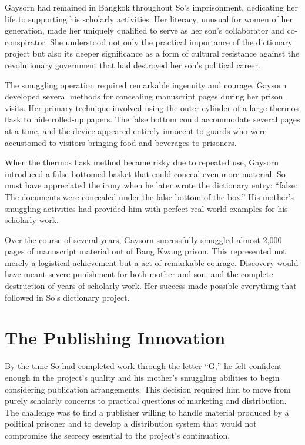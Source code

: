 \documentclass[
  Letterpaper,
]{scrbook}
\begin{document}
Gaysorn had remained in Bangkok throughout So's imprisonment, dedicating
her life to supporting his scholarly activities. Her literacy, unusual
for women of her generation, made her uniquely qualified to serve as her
son's collaborator and co-conspirator. She understood not only the
practical importance of the dictionary project but also its deeper
significance as a form of cultural resistance against the revolutionary
government that had destroyed her son's political career.

The smuggling operation required remarkable ingenuity and courage.
Gaysorn developed several methods for concealing manuscript pages during
her prison visits. Her primary technique involved using the outer
cylinder of a large thermos flask to hide rolled-up papers. The false
bottom could accommodate several pages at a time, and the device
appeared entirely innocent to guards who were accustomed to visitors
bringing food and beverages to prisoners.

When the thermos flask method became risky due to repeated use, Gaysorn
introduced a false-bottomed basket that could conceal even more
material. So must have appreciated the irony when he later wrote the
dictionary entry: ``false: The documents were concealed under the false
bottom of the box.'' His mother's smuggling activities had provided him
with perfect real-world examples for his scholarly work.

Over the course of several years, Gaysorn successfully smuggled almost
2,000 pages of manuscript material out of Bang Kwang prison. This
represented not merely a logistical achievement but a act of remarkable
courage. Discovery would have meant severe punishment for both mother
and son, and the complete destruction of years of scholarly work. Her
success made possible everything that followed in So's dictionary
project.

\section{The Publishing Innovation}\label{the-publishing-innovation}

By the time So had completed work through the letter ``G,'' he felt
confident enough in the project's quality and his mother's smuggling
abilities to begin considering publication arrangements. This decision
required him to move from purely scholarly concerns to practical
questions of marketing and distribution. The challenge was to find a
publisher willing to handle material produced by a political prisoner
and to develop a distribution system that would not compromise the
secrecy essential to the project's continuation.
\end{document}
